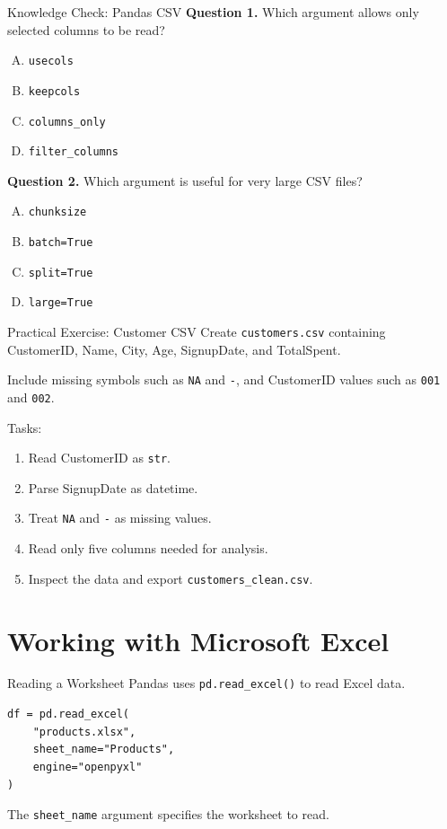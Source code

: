 \documentclass[aspectratio=169,11pt]{beamer}
\newcommand{\code}[1]{\texttt{#1}}
\newcommand{\smallgap}{\vspace{0.4em}}
\begin{document}
\begin{frame}{Knowledge Check: Pandas CSV}
\textbf{Question 1.} Which argument allows only selected columns to be read?
\begin{enumerate}[A.]
  \item \code{usecols}
  \item \code{keepcols}
  \item \code{columns\_only}
  \item \code{filter\_columns}
\end{enumerate}

\smallgap
\textbf{Question 2.} Which argument is useful for very large CSV files?
\begin{enumerate}[A.]
  \item \code{chunksize}
  \item \code{batch=True}
  \item \code{split=True}
  \item \code{large=True}
\end{enumerate}
\end{frame}

\begin{frame}{Practical Exercise: Customer CSV}
Create \code{customers.csv} containing CustomerID, Name, City, Age, SignupDate, and TotalSpent.

Include missing symbols such as \code{NA} and \code{-}, and CustomerID values such as \code{001} and \code{002}.

Tasks:
\begin{enumerate}
  \item Read CustomerID as \code{str}.
  \item Parse SignupDate as datetime.
  \item Treat \code{NA} and \code{-} as missing values.
  \item Read only five columns needed for analysis.
  \item Inspect the data and export \code{customers\_clean.csv}.
\end{enumerate}
\end{frame}

\section{Working with Microsoft Excel}

\begin{frame}[fragile]{Reading a Worksheet}
Pandas uses \code{pd.read\_excel()} to read Excel data.

\begin{lstlisting}[style=pythonstyle]
df = pd.read_excel(
    "products.xlsx",
    sheet_name="Products",
    engine="openpyxl"
)
\end{lstlisting}

The \code{sheet\_name} argument specifies the worksheet to read.
\end{frame}
\end{document}
